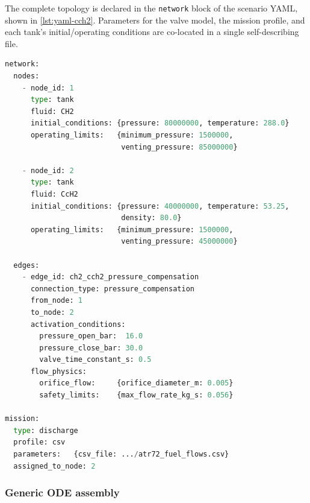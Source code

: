 The complete topology is declared in the \texttt{network} block of the scenario
YAML, shown in \cref{lst:yaml-cch2}.  Parameters for the valve model, the
mission profile, and each tank's initial/operating conditions are co-located in
a single self-describing file.

\begin{lstlisting}[language=Python,
    caption={Abbreviated YAML network block for the CH2/CCH2 case.},
    label=lst:yaml-cch2]
network:
  nodes:
    - node_id: 1
      type: tank
      fluid: CH2
      initial_conditions: {pressure: 80000000, temperature: 288.0}
      operating_limits:   {minimum_pressure: 1500000,
                           venting_pressure: 85000000}

    - node_id: 2
      type: tank
      fluid: CcH2
      initial_conditions: {pressure: 40000000, temperature: 53.25,
                           density: 80.0}
      operating_limits:   {minimum_pressure: 1500000,
                           venting_pressure: 45000000}

  edges:
    - edge_id: ch2_cch2_pressure_compensation
      connection_type: pressure_compensation
      from_node: 1
      to_node: 2
      activation_conditions:
        pressure_open_bar:  16.0
        pressure_close_bar: 30.0
        valve_time_constant_s: 0.5
      flow_physics:
        orifice_flow:     {orifice_diameter_m: 0.005}
        safety_limits:    {max_flow_rate_kg_s: 0.056}

mission:
  type: discharge
  profile: csv
  parameters:   {csv_file: .../atr72_fuel_flows.csv}
  assigned_to_node: 2
\end{lstlisting}

\subsubsection{Generic ODE assembly}

